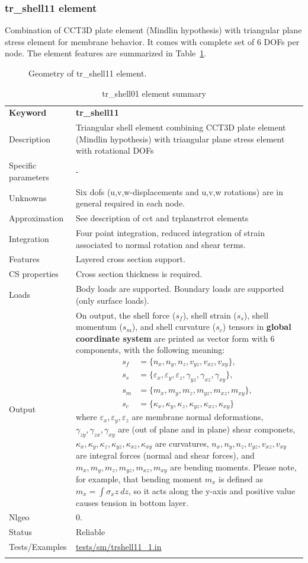 \documentclass[a4paper]{article}
\newcommand{\param}[1]{\texttt{#1}} %
\newcommand{\templabel}{}%
\newcommand{\tempcaption}{}%
\newcounter{nelpar}
\newenvironment{elementsummary}[5]{%
  \gdef\tempcaption{#4}%
  \gdef\templabel{#5}%
  \setcounter{nelpar}{0}%
  \begin{center} %
    \begin{table}[!htb] %
      \begin{tabular}{|l|p{9cm}|}\hline %
        {\bf Keyword} & \bf{#1}\\ %
        {Description} & {#2}\\ %
        {Specific parameters} & {#3}\\ \hline %
}{
  \\ \hline %
      \end{tabular}%
      \caption{\tempcaption}%
      \label{\templabel}%
    \end{table}%
  \end{center}%
}
\newcommand{\elementParam}[1]{%
  \ifthenelse{\value{nelpar}>0} %
             {&{#1}}%
             {\setcounter{nelpar}{1}Parameters&{#1}}%
             \\%
}
\newcommand{\elementDescription}[2]{{#1} & {#2}\\}
\begin{document}
\subsubsection {tr\_shell11  element}
Combination of CCT3D plate element (Mindlin hypothesis) with triangular plane stress element
for membrane behavior. It comes with complete set of 6 DOFs per node. 
The element features are summarized in Table~\ref{trshell01summary}.
\begin{figure}[htb]
 \centering
 \begin{makeimage}
  
 \end{makeimage}
 \caption{Geometry of tr\_shell11 element.}
\end{figure}

\begin{elementsummary}{tr\_shell11}{Triangular shell element combining CCT3D plate element (Mindlin hypothesis) with triangular plane stress element with rotational DOFs}{-}{tr\_shell01 element summary}{trshell01summary}
\elementDescription{Unknowns}{Six dofs (u,v,w-displacements and u,v,w rotations) are in general required in each node.}
\elementDescription{Approximation}{See description of cct and trplanstrrot elements}
\elementDescription{Integration}{Four point integration, reduced integration of strain associated to normal rotation and shear terms.}
\elementDescription{Features}{Layered cross section support.}
\elementDescription{CS properties}{Cross section thickness is required.}
\elementDescription{Loads}{Body loads are supported. Boundary loads are supported (only surface loads).}
\elementDescription{Output}{On output, the shell force ($s_f$), shell strain ($s_s$), shell momentum ($s_m$), and shell curvature ($s_c$) tensors in \textbf{global coordinate system} are printed as vector form with 6 components, with the following meaning:
\begin{align*}
s_f &= \{n_x, n_y, n_z, v_{yz}, v_{xz}, v_{xy}\},\\
s_s &= \{\varepsilon_x, \varepsilon_y, \varepsilon_z, \gamma_{yz}, \gamma_{xz}, \gamma_{xy}\},\\
s_m &= \{m_x, m_y, m_z, m_{yz}, m_{xz}, m_{xy}\},\\
s_c &= \{\kappa_x, \kappa_y, \kappa_z, \kappa_{yz}, \kappa_{xz}, \kappa_{xy}\}
\end{align*}
where $\varepsilon_x, \varepsilon_y, \varepsilon_z$ are membrane normal deformations, $\gamma_{zy}, \gamma_{zx}, \gamma_{xy}$ are (out of plane and in plane) shear componets, $\kappa_x, \kappa_y, \kappa_z, \kappa_{yz}, \kappa_{xz}, \kappa_{xy}$ are curvatures, $n_x, n_y, n_z, v_{yz}, v_{xz}, v_{xy}$ are integral forces (normal and shear forces), and $m_x, m_y, m_z, m_{yz}, m_{xz}, m_{xy}$ are bending moments. 
Please note, for example, that bending moment $m_x$ is defined as $m_x=\int \sigma_x z\ dz$, so it acts along the y-axis and positive value causes tension in bottom layer.}
\elementDescription{Nlgeo}{0.}
\elementDescription{Status}{Reliable}
\elementDescription{Tests/Examples}{\href{https://github.com/oofem/oofem/blob/devel/tests/sm/trshell11\_1.in}{tests/sm/trshell11\_1.in}}
\end{elementsummary}
\end{document}
